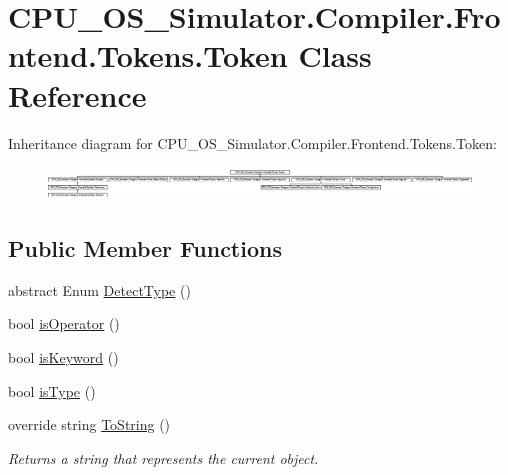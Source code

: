 \hypertarget{class_c_p_u___o_s___simulator_1_1_compiler_1_1_frontend_1_1_tokens_1_1_token}{}\section{C\+P\+U\+\_\+\+O\+S\+\_\+\+Simulator.\+Compiler.\+Frontend.\+Tokens.\+Token Class Reference}
\label{class_c_p_u___o_s___simulator_1_1_compiler_1_1_frontend_1_1_tokens_1_1_token}
Inheritance diagram for C\+P\+U\+\_\+\+O\+S\+\_\+\+Simulator.\+Compiler.\+Frontend.\+Tokens.\+Token\+:\begin{figure}[H]
\begin{center}
\leavevmode
\includegraphics[height=0.869565cm]{class_c_p_u___o_s___simulator_1_1_compiler_1_1_frontend_1_1_tokens_1_1_token}
\end{center}
\end{figure}
\subsection*{Public Member Functions}
\begin{DoxyCompactItemize}
\item 
abstract Enum \hyperlink{class_c_p_u___o_s___simulator_1_1_compiler_1_1_frontend_1_1_tokens_1_1_token_accfe8c46faedacd527ef619698c76310}{Detect\+Type} ()
\item 
bool \hyperlink{class_c_p_u___o_s___simulator_1_1_compiler_1_1_frontend_1_1_tokens_1_1_token_a0a2a90e3f61a2b9cdb8fab576ba03af9}{is\+Operator} ()
\item 
bool \hyperlink{class_c_p_u___o_s___simulator_1_1_compiler_1_1_frontend_1_1_tokens_1_1_token_a8d59fb0bd2432fe5f0bb5a3eb4e15a5d}{is\+Keyword} ()
\item 
bool \hyperlink{class_c_p_u___o_s___simulator_1_1_compiler_1_1_frontend_1_1_tokens_1_1_token_a2119b17e85e5b7ee78909209701620d0}{is\+Type} ()
\item 
override string \hyperlink{class_c_p_u___o_s___simulator_1_1_compiler_1_1_frontend_1_1_tokens_1_1_token_ab1d893f228078256e8dc885d8680443b}{To\+String} ()
\begin{DoxyCompactList}\small\item\em Returns a string that represents the current object. \end{DoxyCompactList}\end{DoxyCompactItemize}
